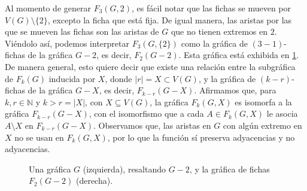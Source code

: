 Al momento de generar $F_3(G,{2})$, es f\'acil notar que las fichas se mueven por
$V(G) \setminus \{2\}$, excepto la ficha que est\'a fija. De igual manera, las
aristas por las que se mueven las fichas son las aristas de $G$ que no tienen
extremos en $2$. Vi\'endolo as\'i, podemos interpretar $F_3(G,\{2\})$ como la
gr\'afica de $(3-1)$-fichas de la gr\'afica $G-2$, es decir, $F_2(G-2)$. Esta
gr\'afica est\'a exhibida en \cref{fig:ex-tok-subgraph-aux}. De manera general,
esto quiere decir que existe una relaci\'on entre la subgr\'afica de $F_k(G)$
inducida por $X$, donde $|r|=X \subset V(G)$, y la gr\'afica de $(k-r)$-fichas
de la gr\'afica $G-X$, es decir, $F_{k-r}(G-X)$. Afirmamos que, para $k,r \in
\mathbb{N}$ y $k>r = |X|$, con $X \subseteq V(G)$, la gr\'afica $F_k(G,X)$ es
isomorfa a la gr\'afica $F_{k-r}(G-X)$, con el isomorfismo que a cada $A \in
F_k(G,X)$ le asocia $A \setminus X$ en $F_{k-r}(G-X)$.   Observamos que, las
aristas en $G$ con alg\'un extremo en $X$ no se usan en $F_k(G,X)$, por lo que
la funci\'on s\'i preserva adyacencias y no adyacencias.

\begin{figure}[ht!]
    \centering
    \caption{Una gr\'afica $G$ (izquierda), resaltando $G-2$, y la 
    gr\'afica de fichas $F_2(G-2)$ (derecha).}
    \label{fig:ex-tok-subgraph-aux}
\end{figure}

